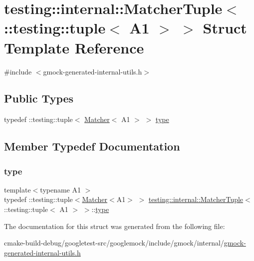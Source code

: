 \hypertarget{structtesting_1_1internal_1_1MatcherTuple_3_01_1_1testing_1_1tuple_3_01A1_01_4_01_4}{}\section{testing\+::internal\+::Matcher\+Tuple$<$ \+::testing\+::tuple$<$ A1 $>$ $>$ Struct Template Reference}
\label{structtesting_1_1internal_1_1MatcherTuple_3_01_1_1testing_1_1tuple_3_01A1_01_4_01_4}


{\ttfamily \#include $<$gmock-\/generated-\/internal-\/utils.\+h$>$}

\subsection*{Public Types}
\begin{DoxyCompactItemize}
\item 
typedef \+::testing\+::tuple$<$ \mbox{\hyperlink{classtesting_1_1Matcher}{Matcher}}$<$ A1 $>$ $>$ \mbox{\hyperlink{structtesting_1_1internal_1_1MatcherTuple_3_01_1_1testing_1_1tuple_3_01A1_01_4_01_4_a8463ac100366f7e8b6ad1035e42ec4b0}{type}}
\end{DoxyCompactItemize}


\subsection{Member Typedef Documentation}
\mbox{\label{structtesting_1_1internal_1_1MatcherTuple_3_01_1_1testing_1_1tuple_3_01A1_01_4_01_4_a8463ac100366f7e8b6ad1035e42ec4b0}} 
\subsubsection{\texorpdfstring{type}{type}}
{\footnotesize\ttfamily template$<$typename A1 $>$ \\
typedef \+::testing\+::tuple$<$\mbox{\hyperlink{classtesting_1_1Matcher}{Matcher}}$<$A1$>$ $>$ \mbox{\hyperlink{structtesting_1_1internal_1_1MatcherTuple}{testing\+::internal\+::\+Matcher\+Tuple}}$<$ \+::testing\+::tuple$<$ A1 $>$ $>$\+::\mbox{\hyperlink{structtesting_1_1internal_1_1MatcherTuple_3_01_1_1testing_1_1tuple_3_01A1_01_4_01_4_a8463ac100366f7e8b6ad1035e42ec4b0}{type}}}



The documentation for this struct was generated from the following file\+:\begin{DoxyCompactItemize}
\item 
cmake-\/build-\/debug/googletest-\/src/googlemock/include/gmock/internal/\mbox{\hyperlink{gmock-generated-internal-utils_8h}{gmock-\/generated-\/internal-\/utils.\+h}}\end{DoxyCompactItemize}
